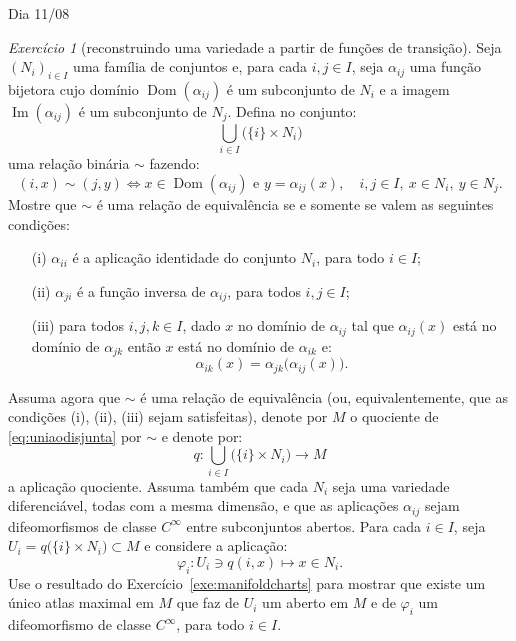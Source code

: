 \documentclass[oneside,11pt]{amsart}
\DeclareMathOperator{\Dom}{Dom}
\DeclareMathOperator{\Img}{Im}
\theoremstyle{remark}\newtheorem{exercise}{Exercício}[section]
\theoremstyle{plain}\newtheorem{teo}{Teorema}[section]
\theoremstyle{plain}\newtheorem{lem}[teo]{Lema}
\theoremstyle{plain}\newtheorem{prop}[teo]{Proposição}
\theoremstyle{definition}\newtheorem{defin}[teo]{Definição}
\theoremstyle{remark}\newtheorem{rem}[teo]{Observação}
\theoremstyle{definition}\newtheorem{example}[teo]{Exemplo}
\numberwithin{equation}{section}
\begin{document}
\begin{section}{Dia 11/08}
\begin{exercise}[reconstruindo uma variedade a partir de funções de transição]
Seja $(N_i)_{i\in I}$ uma família de conjuntos e, para cada $i,j\in I$, seja $\alpha_{ij}$ uma função bijetora cujo domínio $\Dom(\alpha_{ij})$
é um subconjunto de $N_i$ e a imagem $\Img(\alpha_{ij})$ é um subconjunto de $N_j$. Defina no conjunto:
\begin{equation}\label{eq:uniaodisjunta}
\bigcup_{i\in I}\big(\{i\}\times N_i\big)
\end{equation}
uma relação binária $\sim$ fazendo:
\[(i,x)\sim(j,y)\Longleftrightarrow\text{$x\in\Dom(\alpha_{ij})$ e $y=\alpha_{ij}(x)$},\quad i,j\in I,\ x\in N_i,\ y\in N_j.\]
Mostre que $\sim$ é uma relação de equivalência se e somente se valem as seguintes condições:
\begin{itemize}
\item[(i)] $\alpha_{ii}$ é a aplicação identidade do conjunto $N_i$, para todo $i\in I$;
\item[(ii)] $\alpha_{ji}$ é a função inversa de $\alpha_{ij}$, para todos $i,j\in I$;
\item[(iii)] para todos $i,j,k\in I$, dado $x$ no domínio de $\alpha_{ij}$ tal que $\alpha_{ij}(x)$ está no domínio de $\alpha_{jk}$ então
$x$ está no domínio de $\alpha_{ik}$ e:
\[\alpha_{ik}(x)=\alpha_{jk}\big(\alpha_{ij}(x)\big).\]
\end{itemize}
Assuma agora que $\sim$ é uma relação de equivalência (ou, equivalentemente, que as condições (i), (ii), (iii) sejam satisfeitas), denote por $M$
o quociente de \eqref{eq:uniaodisjunta} por $\sim$ e denote por:
\[q:\bigcup_{i\in I}\big(\{i\}\times N_i\big)\longrightarrow M\]
a aplicação quociente. Assuma também que cada $N_i$ seja uma variedade diferenciável, todas com a mesma dimensão,
e que as aplicações $\alpha_{ij}$ sejam difeomorfismos de classe $C^\infty$ entre subconjuntos abertos. Para cada $i\in I$, seja
$U_i=q\big(\{i\}\times N_i\big)\subset M$ e considere a aplicação:
\[\varphi_i:U_i\ni q(i,x)\longmapsto x\in N_i.\]
Use o resultado do Exercício~\ref{exe:manifoldcharts} para mostrar que existe um único atlas maximal em $M$ que faz de $U_i$ um aberto em $M$
e de $\varphi_i$ um difeomorfismo de classe $C^\infty$, para todo $i\in I$.
\end{exercise}

\end{section}
\end{document}
